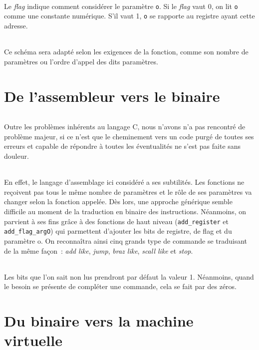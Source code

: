 \documentclass[11pt]{article}
\begin{document}
	\paragraph{}
	Le \textit{flag} indique comment considérer le paramètre \verb?o?. Si le \textit{flag} vaut 0, on lit \verb?o? comme une constante numérique. S'il vaut 1, \verb?o? se rapporte au registre ayant cette adresse.
	\paragraph{}
	Ce schéma sera adapté selon les exigences de la fonction, comme son nombre de paramètres ou l'ordre d'appel des dits paramètres.

	\part*{De l'assembleur vers le binaire}
	\paragraph{}
	Outre les problèmes inhérents au langage C, nous n'avons n'a pas rencontré de problème majeur, si ce n'est que le cheminement vers un code purgé de toutes ses erreurs et capable de répondre à toutes les éventualités ne s'est pas faite sans douleur.
	\paragraph{}
	En effet, le langage d'assemblage ici considéré a ses subtilités. Les fonctions ne reçoivent pas tous le même nombre de paramètres et le rôle de ses paramètres va changer selon la fonction appelée. Dès lors, une approche générique semble difficile au moment de la traduction en binaire des instructions. Néanmoins, on parvient à ses fins grâce à des fonctions de haut niveau (\verb?add_register? et \verb?add_flag_argO?) qui parmettent d'ajouter les bits de registre, de flag et du paramètre o. On reconnaîtra ainsi cinq grands type de commande se traduisant de la même façon~: \textit{add like}, \textit{jump}, \textit{braz like}, \textit{scall like} et \textit{stop}.
	\paragraph{}
	Les bits que l'on sait non lus prendront par défaut la valeur 1. Néanmoins, quand le besoin se présente de compléter une commande, cela se fait par des zéros.

	\part*{Du binaire vers la machine virtuelle}
\end{document}
